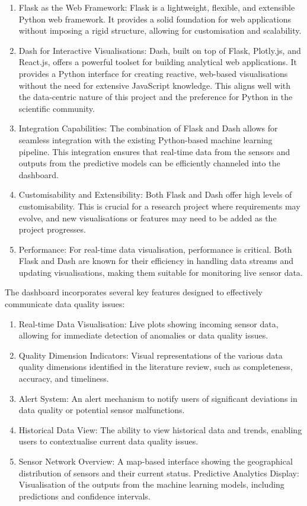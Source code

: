 \begin{enumerate}
    \item Flask as the Web Framework: Flask is a lightweight, flexible, and extensible Python web framework. It provides a solid foundation for web applications without imposing a rigid structure, allowing for customisation and scalability.
    \item Dash for Interactive Visualisations: Dash, built on top of Flask, Plotly.js, and React.js, offers a powerful toolset for building analytical web applications. It provides a Python interface for creating reactive, web-based visualisations without the need for extensive JavaScript knowledge. This aligns well with the data-centric nature of this project and the preference for Python in the scientific community.
    \item Integration Capabilities: The combination of Flask and Dash allows for seamless integration with the existing Python-based machine learning pipeline. This integration ensures that real-time data from the sensors and outputs from the predictive models can be efficiently channeled into the dashboard.
    \item Customisability and Extensibility: Both Flask and Dash offer high levels of customisability. This is crucial for a research project where requirements may evolve, and new visualisations or features may need to be added as the project progresses.
    \item Performance: For real-time data visualisation, performance is critical. Both Flask and Dash are known for their efficiency in handling data streams and updating visualisations, making them suitable for monitoring live sensor data.
\end{enumerate}

The dashboard incorporates several key features designed to effectively communicate data quality issues:
\begin{enumerate}
    \item Real-time Data Visualisation: Live plots showing incoming sensor data, allowing for immediate detection of anomalies or data quality issues.
    \item Quality Dimension Indicators: Visual representations of the various data quality dimensions identified in the literature review, such as completeness, accuracy, and timeliness.
    \item Alert System: An alert mechanism to notify users of significant deviations in data quality or potential sensor malfunctions.
    \item Historical Data View: The ability to view historical data and trends, enabling users to contextualise current data quality issues.
    \item Sensor Network Overview: A map-based interface showing the geographical distribution of sensors and their current status.
          Predictive Analytics Display: Visualisation of the outputs from the machine learning models, including predictions and confidence intervals.
\end{enumerate}

